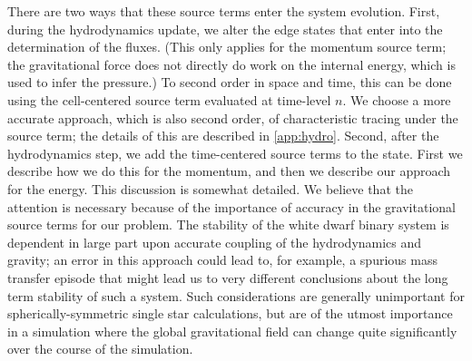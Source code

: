 \documentclass[iop,numberedappendix]{../emulateapj}
\begin{document}
There are two ways that these source terms enter the system evolution. 
First, during the hydrodynamics update, we alter the edge states that enter
into the determination of the fluxes. (This only applies for the momentum source term;
the gravitational force does not directly do work on the internal energy, which is used 
to infer the pressure.) To second order in space and time, 
this can be done using the cell-centered
source term evaluated at time-level $n$. We choose a more accurate approach, 
which is also second order, of characteristic tracing
under the source term; the details of this are described in 
\autoref{app:hydro}. Second, after the hydrodynamics step, we add the time-centered source terms
to the state. First we describe how we do this for the momentum,
and then we describe our approach for the energy. This discussion is somewhat detailed.
We believe that the attention is necessary because of the importance of accuracy
in the gravitational source terms for our problem. The stability of the white dwarf binary
system is dependent in large part upon accurate coupling of the hydrodynamics and gravity;
an error in this approach could lead to, for example, a spurious mass transfer episode
that might lead us to very different conclusions about the long term stability of such a system.
Such considerations are generally unimportant for spherically-symmetric single star calculations,
but are of the utmost importance in a simulation where the global gravitational field can change 
quite significantly over the course of the simulation.
\end{document}
